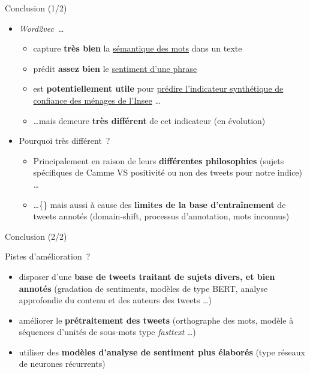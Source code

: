 \documentclass[10pt,xcolor=table,color={dvipsnames,usenames},ignorenonframetext,usepdftitle=false,french]{beamer}
\providecommand{\tightlist}{%
  \setlength{\parskip}{0pt}
  }
\begin{document}
\begin{frame}{Conclusion (1/2)}
\protect\hypertarget{conclusion-12}{}

\begin{itemize}
\item
  \emph{Word2vec}~\dots

  \begin{itemize}
  \tightlist
  \item
    capture \textbf{très bien} la \underline{sémantique des mots} dans
    un texte
  \item
    prédit \textbf{assez bien} le \underline{sentiment d’une phrase}
  \item
    est \textbf{potentiellement utile} pour
    \underline{prédire l’indicateur synthétique de}
    \underline{confiance des ménages de l’Insee} \dots
  \item
    \dots mais demeure \textbf{très différent} de cet indicateur (en
    évolution)
  \end{itemize}
\end{itemize}

\bigskip

\pause

\begin{itemize}
\tightlist
\item
  Pourquoi très différent~?

  \begin{itemize}
  \tightlist
  \item
    Principalement en raison de leurs \textbf{différentes philosophies}
    \footnotesize (sujets spécifiques de Camme VS positivité ou non des
    tweets pour notre indice) \normalsize \dots
  \item
    \dots\{\} mais aussi à cause des \textbf{limites de la base
    d’entraînement} de tweets annotés \footnotesize (domain-shift,
    processus d’annotation, mots inconnus) \normalsize
  \end{itemize}
\end{itemize}

\end{frame}

\begin{frame}{Conclusion (2/2)}
\protect\hypertarget{conclusion-22}{}

Pistes d’amélioration~?

\begin{itemize}
\item
  disposer d’une \textbf{base de tweets traitant de sujets divers, et
  bien annotés} \footnotesize (gradation de sentiments, modèles de type
  BERT, analyse approfondie du contenu et des auteurs des tweets \dots)
  \normalsize
\item
  améliorer le \textbf{prétraitement des tweets}
  \footnotesize (orthographe des mots, modèle à séquences d’unités de
  sous-mots type \emph{fasttext} \dots)\normalsize
\item
  utiliser des \textbf{modèles d’analyse de sentiment plus élaborés}
  \footnotesize  (type réseaux de neurones récurrents)\normalsize
\end{itemize}

\end{frame}
\end{document}
